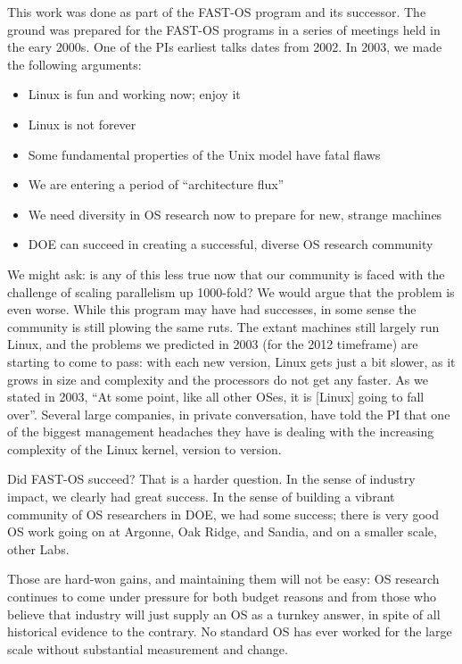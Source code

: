 \documentclass{report}
\begin{document}
This work was done as part of the FAST-OS program and its successor. 
The ground was prepared for the FAST-OS programs in a series of meetings held in
the eary 2000s. One of the PIs earliest talks dates from 2002. In 2003, we made
the following arguments: 
\begin{itemize}
\item Linux is fun and working now; enjoy it
\item Linux is not forever
\item Some fundamental properties of the Unix model have fatal flaws
\item We are entering a period of “architecture flux” 
\item We need diversity in OS research now to prepare for new, strange machines
\item DOE can succeed in creating a successful, diverse OS research community
\end{itemize}

We might ask: is any of this less true now that our community is faced with 
the challenge of scaling parallelism up 1000-fold? We would argue that 
the problem is even worse. While this program may have had successes, in some 
sense the community is 
still plowing the same ruts. The extant machines still largely run Linux, and the 
problems we predicted in 2003 (for the 2012 timeframe) are starting to 
come to pass: with each new version, Linux gets just a bit slower, as it grows in size 
and complexity and the processors do not get any faster. As we stated in 2003, 
``At some point, like all other OSes, it is [Linux] going to fall over''. 
Several large companies, in private conversation, have told the PI that one of the
biggest management headaches they have is dealing with the increasing complexity of 
the Linux kernel, version to version. 

Did FAST-OS succeed? That is a harder question. In the sense of industry impact, we 
clearly had great success. In the sense of building a vibrant community of OS researchers
in DOE, we had some success; there is very good OS work going on at Argonne, Oak Ridge, 
and Sandia, and on a smaller scale, other Labs. 

Those are hard-won gains, and maintaining them 
will not be easy: OS research continues to come under 
pressure for both budget reasons and 
from those who believe that industry will just supply an OS as a turnkey 
answer, in spite of all historical evidence to the contrary. No standard OS has ever worked
for the large scale without substantial measurement and change. 
\end{document}
